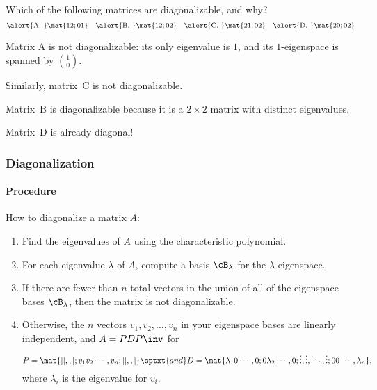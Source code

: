 \begin{pollframe}

\begin{poll}
\begin{bluebox}[Poll]{.8\linewidth}
  Which of the following matrices are diagonalizable, and why?
  \[
  \alert{\text{A. }} \mat{1 2; 0 1} \quad
  \alert{\text{B. }} \mat{1 2; 0 2} \quad
  \alert{\text{C. }} \mat{2 1; 0 2} \quad
  \alert{\text{D. }} \mat{2 0; 0 2}
  \]
\end{bluebox}

\pause\bigskip
Matrix \alert{A} is not diagonalizable: its only eigenvalue is $1$, and its
$1$-eigenspace is spanned by ${1\choose 0}$.

\pause\bigskip
Similarly, matrix~\alert{C} is not diagonalizable.

\pause\bigskip
Matrix~\alert{B} is diagonalizable because it is a $2\times 2$ matrix with
distinct eigenvalues.

\pause\bigskip
Matrix~\alert{D} is already diagonal!
\end{poll}

\end{pollframe}



\begin{frame}
\frametitle{Diagonalization}
\framesubtitle{Procedure}

\alert{\large How to diagonalize a matrix $A$:}
\begin{enumerate}
  \pause
\item Find the eigenvalues of $A$ using the characteristic polynomial. 
  \pause
\item For each eigenvalue $\lambda$ of $A$, compute a basis $\cB_\lambda$ for the
  $\lambda$-eigenspace.
  \pause
\item If there are fewer than $n$ total vectors in the union of all of the
  eigenspace bases $\cB_\lambda$, then the matrix is not diagonalizable.
  \pause
\item Otherwise, the $n$ vectors $v_1,v_2,\ldots,v_n$ in your eigenspace bases are
  linearly independent, and $A = PDP\inv$ for
  \[ P = \mat{| |,, |; v_1 v_2 \cdots, v_n; | | ,, |} \sptxt{and}
  D = \mat{\lambda_1 0 \cdots, 0;
    0 \lambda_2 \cdots, 0;
    \vdots, \vdots, \ddots, \vdots;
    0 0 \cdots, \lambda_n}, \]
  where $\lambda_i$ is the eigenvalue for $v_i$.

\end{enumerate}

\end{frame}


